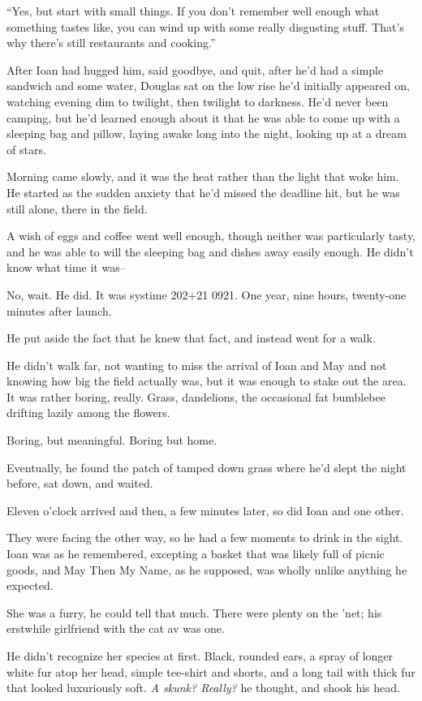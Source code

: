 ``Yes, but start with small things. If you don't remember well enough what something tastes like, you can wind up with some really disgusting stuff. That's why there's still restaurants and cooking.''

After Ioan had hugged him, said goodbye, and quit, after he'd had a simple sandwich and some water, Douglas sat on the low rise he'd initially appeared on, watching evening dim to twilight, then twilight to darkness. He'd never been camping, but he'd learned enough about it that he was able to come up with a sleeping bag and pillow, laying awake long into the night, looking up at a dream of stars.

Morning came slowly, and it was the heat rather than the light that woke him. He started as the sudden anxiety that he'd missed the deadline hit, but he was still alone, there in the field.

A wish of eggs and coffee went well enough, though neither was particularly tasty, and he was able to will the sleeping bag and dishes away easily enough. He didn't know what time it was--

No, wait. He did. It was systime 202+21 0921. One year, nine hours, twenty-one minutes after launch.

He put aside the fact that he knew that fact, and instead went for a walk.

He didn't walk far, not wanting to miss the arrival of Ioan and May and not knowing how big the field actually was, but it was enough to stake out the area. It was rather boring, really. Grass, dandelions, the occasional fat bumblebee drifting lazily among the flowers.

Boring, but meaningful. Boring but home.

Eventually, he found the patch of tamped down grass where he'd slept the night before, sat down, and waited.

Eleven o'clock arrived and then, a few minutes later, so did Ioan and one other.

They were facing the other way, so he had a few moments to drink in the sight. Ioan was as he remembered, excepting a basket that was likely full of picnic goods, and May Then My Name, as he supposed, was wholly unlike anything he expected.

She was a furry, he could tell that much. There were plenty on the 'net; his erstwhile girlfriend with the cat av was one.

He didn't recognize her species at first. Black, rounded ears, a spray of longer white fur atop her head, simple tee-shirt and shorts, and a long tail with thick fur that looked luxuriously soft. \emph{A skunk? Really?} he thought, and shook his head.

